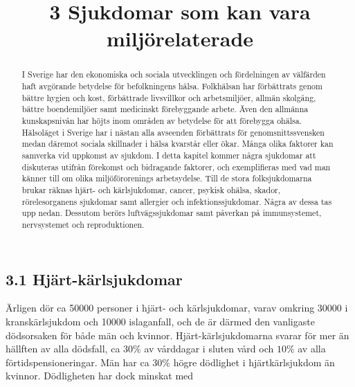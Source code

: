 \title{
3 Sjukdomar som kan vara miljörelaterade
}
\begin{abstract}
I Sverige har den ekonomiska och sociala utvecklingen och fördelningen av välfärden haft avgörande betydelse för befolkningens hälsa. Folkhälsan har förbättrats genom bättre hygien och kost, förbättrade livsvillkor och arbetsmiljöer, allmän skolgång, bättre boendemiljöer samt medicinskt förebyggande arbete. Även den allmänna kunskapsnivån har höjts inom områden av betydelse för att förebygga ohälsa. Hälsoläget i Sverige har i nästan alla avseenden förbättrats för genomsnittssvensken medan däremot sociala skillnader i hälsa kvarstår eller ökar.
Många olika faktorer kan samverka vid uppkomst av sjukdom. I detta kapitel kommer några sjukdomar att diskuteras utifrån förekomst och bidragande faktorer, och exemplifieras med vad man känner till om olika miljöförorenings arbetsydelse.
Till de stora folksjukdomarna brukar räknas hjärt- och kärlsjukdomar, cancer, psykisk ohälsa, skador, rörelesorganens sjukdomar samt allergier och infektionssjukdomar. Några av dessa tas upp nedan. Dessutom berörs luftvägssjukdomar samt påverkan på immunsystemet, nervsystemet och reproduktionen.
\end{abstract}
\subsection*{3.1 Hjärt-kärlsjukdomar}
Ärligen dör ca 50000 personer i hjärt- och kärlsjukdomar, varav omkring 30000 i kranskärlsjukdom och 10000 islaganfall, och de är därmed den vanligaste dödsorsaken för både män och kvinnor. Hjärt-kärlsjukdomarna svarar för mer än hällften av alla dödsfall, ca \(30 \%\) av vårddagar i sluten vård och \(10 \%\) av alla förtidspensioneringar. Män har ca \(30 \%\) högre dödlighet i hjärtkärlsjukdom än kvinnor. Dödligheten har dock minskat med

